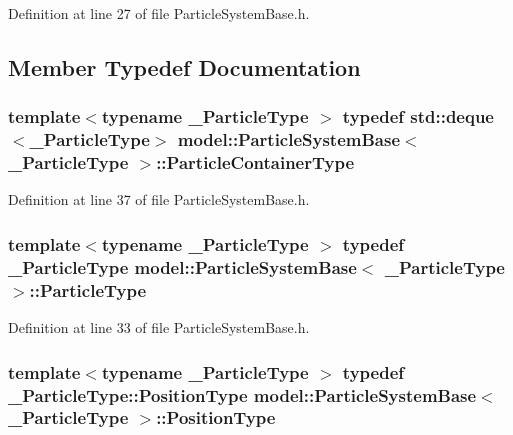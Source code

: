 Definition at line 27 of file Particle\+System\+Base.\+h.



\subsection{Member Typedef Documentation}
\hypertarget{classmodel_1_1_particle_system_base_ac95d9a819d1da5e86f726494bf6df504}{}
\subsubsection[{Particle\+Container\+Type}]{\setlength{\rightskip}{0pt plus 5cm}template$<$typename \+\_\+\+Particle\+Type $>$ typedef std\+::deque$<$\+\_\+\+Particle\+Type$>$ {\bf model\+::\+Particle\+System\+Base}$<$ \+\_\+\+Particle\+Type $>$\+::{\bf Particle\+Container\+Type}}\label{classmodel_1_1_particle_system_base_ac95d9a819d1da5e86f726494bf6df504}


Definition at line 37 of file Particle\+System\+Base.\+h.

\hypertarget{classmodel_1_1_particle_system_base_a3a4f5423639021d769ab7d4cfbf246c3}{}
\subsubsection[{Particle\+Type}]{\setlength{\rightskip}{0pt plus 5cm}template$<$typename \+\_\+\+Particle\+Type $>$ typedef \+\_\+\+Particle\+Type {\bf model\+::\+Particle\+System\+Base}$<$ \+\_\+\+Particle\+Type $>$\+::{\bf Particle\+Type}}\label{classmodel_1_1_particle_system_base_a3a4f5423639021d769ab7d4cfbf246c3}


Definition at line 33 of file Particle\+System\+Base.\+h.

\hypertarget{classmodel_1_1_particle_system_base_ab0a407d587b9779443f0b45e55185002}{}
\subsubsection[{Position\+Type}]{\setlength{\rightskip}{0pt plus 5cm}template$<$typename \+\_\+\+Particle\+Type $>$ typedef \+\_\+\+Particle\+Type\+::\+Position\+Type {\bf model\+::\+Particle\+System\+Base}$<$ \+\_\+\+Particle\+Type $>$\+::{\bf Position\+Type}}\label{classmodel_1_1_particle_system_base_ab0a407d587b9779443f0b45e55185002}


